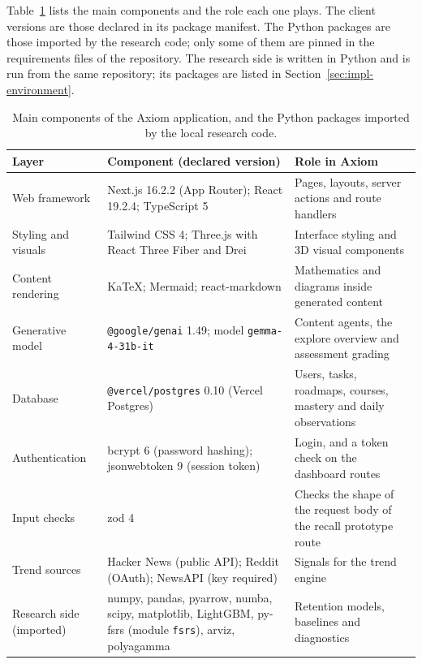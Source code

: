 Table~\ref{tab:axiom-tools} lists the main components and the role each one plays. The client versions are those declared in its package manifest. The Python packages are those imported by the research code; only some of them are pinned in the requirements files of the repository. The research side is written in Python and is run from the same repository; its packages are listed in Section~\ref{sec:impl-environment}.

\begin{table}[htbp]
  \centering
  \caption{Main components of the Axiom application, and the Python packages imported by the local research code.}
  \label{tab:axiom-tools}
  \footnotesize
  \begin{tabular}{@{}p{3.0cm}p{5.4cm}p{5.4cm}@{}}
    \toprule
    Layer & Component (declared version) & Role in Axiom \\
    \midrule
    Web framework & Next.js 16.2.2 (App Router); React 19.2.4; TypeScript 5 & Pages, layouts, server actions and route handlers \\
    Styling and visuals & Tailwind CSS 4; Three.js with React Three Fiber and Drei & Interface styling and 3D visual components \\
    Content rendering & KaTeX; Mermaid; react-markdown & Mathematics and diagrams inside generated content \\
    Generative model & \texttt{@google/genai} 1.49; model \texttt{gemma-4-31b-it} & Content agents, the explore overview and assessment grading \\
    Database & \texttt{@vercel/postgres} 0.10 (Vercel Postgres) & Users, tasks, roadmaps, courses, mastery and daily observations \\
    Authentication & bcrypt 6 (password hashing); jsonwebtoken 9 (session token) & Login, and a token check on the dashboard routes \\
    Input checks & zod 4 & Checks the shape of the request body of the recall prototype route \\
    Trend sources & Hacker News (public API); Reddit (OAuth); NewsAPI (key required) & Signals for the trend engine \\
    Research side (imported) & numpy, pandas, pyarrow, numba, scipy, matplotlib, LightGBM, py-fsrs (module \texttt{fsrs}), arviz, polyagamma & Retention models, baselines and diagnostics \\
    \bottomrule
  \end{tabular}
\end{table}

